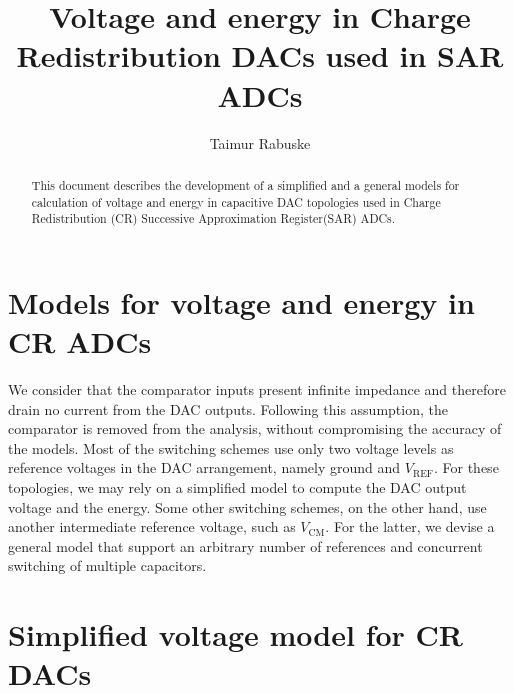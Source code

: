 \documentclass[]{article}
\title{Voltage and energy in Charge Redistribution DACs used in SAR ADCs}
\author{Taimur Rabuske}
\newcommand{\vref}{\ensuremath{V_\mathrm{REF}}}
\newcommand{\vcm}{\ensuremath{V_\mathrm{CM}}}
\begin{document}
\maketitle

\begin{abstract}

This document describes the development of a simplified and a general models for calculation of voltage and energy in capacitive DAC topologies used in Charge Redistribution (CR) Successive Approximation Register(SAR) ADCs.

\end{abstract}


\section{Models for voltage and energy in CR ADCs}

We consider that the comparator inputs present infinite impedance and therefore drain no current from the DAC outputs. Following this assumption, the comparator is removed from the analysis, without compromising the accuracy of the models. Most of the switching schemes use only two voltage levels as reference voltages in the DAC arrangement, namely ground and $\vref$. For these topologies, we may rely on a simplified model to compute the DAC output voltage and the energy. Some other switching schemes, on the other hand, use another intermediate reference voltage, such as $\vcm$. For the latter, we devise a general model that support an arbitrary number of references and concurrent switching of multiple capacitors.

\section{Simplified voltage model for CR DACs}
\label{subsec:model_simple}

\label{sec:dac_model}
\end{document}
